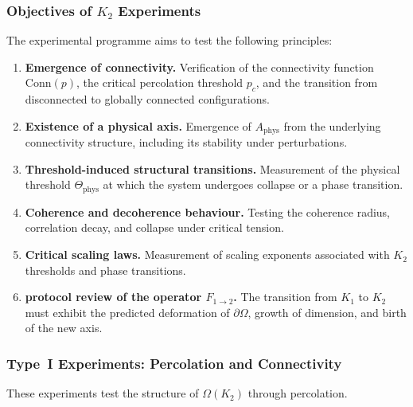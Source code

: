\subsubsection{Objectives of \texorpdfstring{$K_2$}{K_2} Experiments}

The experimental programme aims to test the following principles:

\begin{enumerate}
    \item \textbf{Emergence of connectivity.}
          Verification of the connectivity function $\mathrm{Conn}(p)$,
          the critical percolation threshold $p_c$, and the transition
          from disconnected to globally connected configurations.

    \item \textbf{Existence of a physical axis.}
          Emergence of $A_{\mathrm{phys}}$ from the underlying
          connectivity structure, including its stability under perturbations.

    \item \textbf{Threshold-induced structural transitions.}
          Measurement of the physical threshold $\Theta_{\mathrm{phys}}$
          at which the system undergoes collapse or a phase transition.

    \item \textbf{Coherence and decoherence behaviour.}
          Testing the coherence radius, correlation decay, and collapse
          under critical tension.

    \item \textbf{Critical scaling laws.}
          Measurement of scaling exponents associated with $K_2$ thresholds
          and phase transitions.

    \item \textbf{protocol review of the operator $F_{1 \rightarrow 2}$.}
          The transition from $K_1$ to $K_2$ must exhibit the predicted
          deformation of $\partial\Omega$, growth of dimension, and
          birth of the new axis.
\end{enumerate}



\subsubsection{Type~I Experiments: Percolation and Connectivity}

These experiments test the structure of $\Omega(K_2)$ through percolation.

